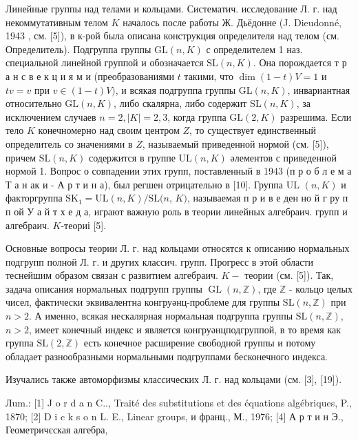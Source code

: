 \documentclass[10pt]{article}
\begin{document}
Линейные группы над телами и кольцами. Систематич. исследование Л. г. над некоммутативным телом $K$ началось после работы Ж. Дьёдонне (J. Dieudonné, 1943 , см. [5]), в к-рой была описана конструкция определителя над телом (см. Определитель). Подгруппа группы $\mathrm{GL}(n, K)$ с определителем 1 наз. специальной линейной группой и обозначается $\mathrm{SL}(n, K)$. Она порождается т р а н с в е к ц и я м и (преобразованиями $t$ такими, что $\operatorname{dim}(1-t) V=1$ и $t v=v$ при $v \in(1-t) V)$, и всякая подгруппа группы $\mathrm{GL}(n, K)$, инвариантная относительно $\mathrm{GL}(n, K)$, либо скалярна, либо содержит $\mathrm{SL}(n, K)$, за исключением случаев $n=2,|K|=2,3$, когда группа $\mathrm{GL}(2, K)$ разрешима. Если тело $K$ конечномерно над своим центром $Z$, то существует единственный определитель со значениями в $Z$, называемый приведенной нормой (см. [5]), причем $\mathrm{SL}(n, K)$ содержится в группе $\mathrm{UL}(n, K)$ әлементов с приведенной нормой 1. Вопрос о совпадении этих групп, поставленный в 1943 (п р о б л е м а Т а н ак и - А р т и н а), был регшен отрицательно в [10]. Группа UL $(n, K)$ и факторгруппа $\mathrm{SK}_{1}=\mathrm{UL}(n, K) / \mathrm{SL}(n$, $K)$, называемая п р и в е ден но й г ру п п ой У а й т х е д а, играют важную роль в теории линейных алгебраич. групп и алгебраич. $K$-теориі [5].



Основные вопросы теории Л. г. над кольцами относятся к описанию нормальных подгрупп полной Л. г. и других классич. групп. Прогресс в этой области теснейшим образом связан с развитием алгебраич. $K-$ теории (см. [5]). Так, задача описания нормальных подгрупп группы $\operatorname{GL}(n, \mathbb{Z})$, где $\mathbb{Z}$ - кольцо целых чисел, фактически эквивалентна конгруәнц-проблеме для группы $\mathrm{SL}(n, \mathbb{Z})$ при $n>2$. А именно, всякая нескалярная нормальная подгруппа группы $\mathrm{SL}(n, \mathbb{Z})$, $n>2$, имеет конечный индекс и является конгруәнцподгруппой, в то время как группа $\mathrm{SL}(2, \mathbb{Z})$ есть конечное расширение свободной группы и потому обладает разнообразными нормальными подгруппами бесконечного индекса.



Изучались также автоморфизмы классических Л. г. над кольцами (см. [3], [19]).



Лum.: [1] J o r d a n C.., Traité des substitutions et des équations algébriques, P., 1870; [2] D i c k s o n L. E., Linear groups, и франц., М., 1976; [4] А р т и н Э., Геометричєская алгебра,
\end{document}
